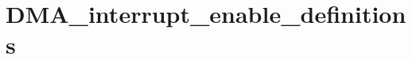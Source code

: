 \hypertarget{group___d_m_a__interrupt__enable__definitions}{\section{D\-M\-A\-\_\-interrupt\-\_\-enable\-\_\-definitions}
\label{group___d_m_a__interrupt__enable__definitions}
}
